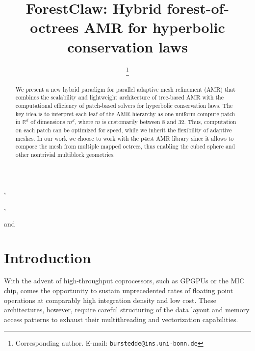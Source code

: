 \documentclass{IOS-Book-Article}     %
\newcommand{\sR}{\mathbb{R}}
\begin{document}
\begin{frontmatter}          %
%
\title{ForestClaw:
        Hybrid forest-of-octrees AMR for hyperbolic conservation laws}

%
\author[A]{ %
\thanks{Corresponding author.  E-mail: \texttt{burstedde@ins.uni-bonn.de}}},
\author[B]{ },
\author[C]{ } and
\author[C]{ }
\address[A]{Institut f\"ur Numerische Simulation, Universit\"at Bonn, Germany}
\address[B]{Boise State University, Idaho, USA}
\address[C]{Institute for Computational Engineering and Sciences,\\
The University of Texas at Austin, USA}

\begin{abstract}
%
We present a new hybrid paradigm for parallel adaptive mesh refinement (AMR)
that combines the scalability and lightweight architecture of tree-based AMR
with the computational efficiency of patch-based solvers for hyperbolic
conservation laws.  The key idea is to interpret each leaf of the AMR hierarchy
as one uniform compute patch in $\sR^d$ of dimensions $m^d$, where $m$ is
customarily between 8 and 32.  Thus, computation on each patch can be optimized
for speed, while we inherit the flexibility of adaptive meshes.  In our work we
choose to work with the p4est AMR library since it allows to compose the mesh
from multiple mapped octrees, thus enabling the cubed sphere and other
nontrivial multiblock geometries.
%
\end{abstract}


\end{frontmatter}


\section*{Introduction}

With the advent of high-throughput coprocessors, such as GPGPUs or the MIC
chip, comes the opportunity to sustain unprecedented rates of floating point
operations at comparably high integration density and low cost.  These
architectures, however, require careful structuring of the data layout and
memory access patterns to exhaust their multithreading and vectorization
capabilities.
\end{document}
